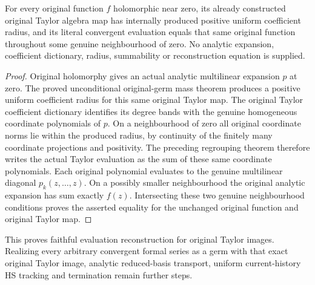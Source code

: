 \begin{theorem}
\label{hir:actual-original-taylor-function-reconstruction}
\leanok
For every original function $f$ holomorphic near zero, its already
constructed original Taylor algebra map has internally produced
positive uniform coefficient radius, and its literal convergent
evaluation equals that same original function throughout some
genuine neighbourhood of zero. No analytic expansion, coefficient
dictionary, radius, summability or reconstruction equation is supplied.
\end{theorem}
\begin{proof}
Original holomorphy gives an actual analytic multilinear expansion
$p$ at zero. The proved unconditional original-germ mass theorem
produces a positive uniform coefficient radius for this same
original Taylor map. The original Taylor coefficient dictionary
identifies its degree bands with the genuine homogeneous coordinate
polynomials of $p$. On a neighbourhood of zero all original coordinate
norms lie within the produced radius, by continuity of the finitely
many coordinate projections and positivity. The preceding regrouping
theorem therefore writes the actual Taylor evaluation as the sum
of these same coordinate polynomials. Each original polynomial
evaluates to the genuine multilinear diagonal $p_k(z,\ldots,z)$.
On a possibly smaller neighbourhood the original analytic expansion
has sum exactly $f(z)$. Intersecting these two genuine neighbourhood
conditions proves the asserted equality for the unchanged original
function and original Taylor map.
\end{proof}

This proves faithful evaluation reconstruction for original Taylor
images. Realizing every arbitrary convergent formal series as a germ
with that exact original Taylor image, analytic reduced-basis transport,
uniform current-history HS tracking and termination remain further steps.
